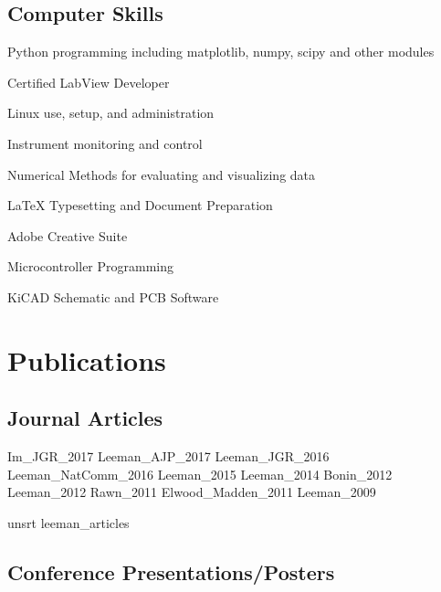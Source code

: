 \documentclass[letterpaper]{article}
\renewenvironment{itemize}{
  \begin{list}{}{
    \setlength{\leftmargin}{1.5em}
  }
}{
  \end{list}
}
\begin{document}
\subsection*{Computer Skills}

\begin{itemize}
\item Python programming including matplotlib, numpy, scipy and other modules
\item Certified LabView Developer
\item Linux use, setup, and administration
\item Instrument monitoring and control
\item Numerical Methods for evaluating and visualizing data
\item \LaTeX{} Typesetting and Document Preparation
\item Adobe Creative Suite
\item Microcontroller Programming
\item KiCAD Schematic and PCB Software
\end{itemize}



\section*{Publications}



\subsection*{Journal Articles}

\begingroup
\renewcommand{\section}[2]{}

\nocite{journal}{Im_JGR_2017}
\nocite{journal}{Leeman_AJP_2017}
\nocite{journal}{Leeman_JGR_2016}
\nocite{journal}{Leeman_NatComm_2016}
\nocite{journal}{Leeman_2015}
\nocite{journal}{Leeman_2014}
\nocite{journal}{Bonin_2012}
\nocite{journal}{Leeman_2012}
\nocite{journal}{Rawn_2011}
\nocite{journal}{Elwood_Madden_2011}
\nocite{journal}{Leeman_2009}

{unsrt}
{leeman_articles}{}
\endgroup

\subsection*{Conference Presentations/Posters}
\end{document}
